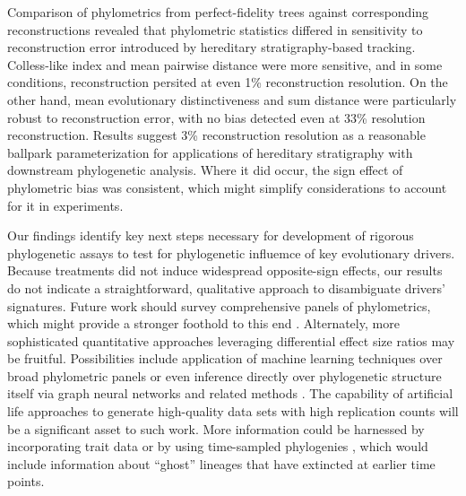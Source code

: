 Comparison of phylometrics from perfect-fidelity trees against corresponding reconstructions revealed that phylometric statistics differed in sensitivity to reconstruction error introduced by hereditary stratigraphy-based tracking.
Colless-like index and mean pairwise distance were more sensitive, and in some conditions, reconstruction persited at even 1\% reconstruction resolution.
On the other hand, mean evolutionary distinctiveness and sum distance were particularly robust to reconstruction error, with no bias detected even at 33\% resolution reconstruction.
Results suggest 3\% reconstruction resolution as a reasonable ballpark parameterization for applications of hereditary stratigraphy with downstream phylogenetic analysis.
Where it did occur, the sign effect of phylometric bias was consistent, which might simplify considerations to account for it in experiments.

Our findings identify key next steps necessary for development of rigorous phylogenetic assays to test for phylogenetic influemce of key evolutionary drivers.
Because treatments did not induce widespread opposite-sign effects, our results do not indicate a straightforward, qualitative approach to disambiguate drivers' signatures.
Future work should survey comprehensive panels of phylometrics, which might provide a stronger foothold to this end \citep{tuckerGuidePhylogeneticMetrics2017}.
Alternately, more sophisticated quantitative approaches leveraging differential effect size ratios may be fruitful.
Possibilities include application of machine learning techniques over broad phylometric panels \citep{voznica2022deep} or even inference directly over phylogenetic structure itself via graph neural networks and related methods \citep{lajaaiti2023comparison}.
The capability of artificial life approaches to generate high-quality data sets with high replication counts will be a significant asset to such work.
More information could be harnessed by incorporating trait data \citep{nozoe2017inferring} or by using time-sampled phylogenies \citep{volz2013viral}, which would include information about ``ghost'' lineages that have extincted at earlier time points.

